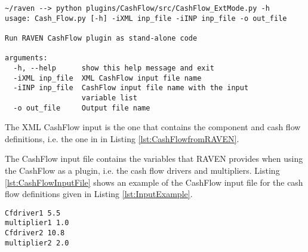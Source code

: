 \small
\begin{lstlisting}[caption=CashFlow run as stand-alone python code, label=lst:CashFlowAsCode]
~/raven --> python plugins/CashFlow/src/CashFlow_ExtMode.py -h
usage: Cash_Flow.py [-h] -iXML inp_file -iINP inp_file -o out_file

Run RAVEN CashFlow plugin as stand-alone code

arguments:
  -h, --help      show this help message and exit
  -iXML inp_file  XML CashFlow input file name
  -iINP inp_file  CashFlow input file name with the input 
                  variable list
  -o out_file     Output file name
\end{lstlisting}
\normalsize

The XML CashFlow input is the one that contains the component and cash flow definitions, i.e. the one in  in Listing \ref{lst:CashFlowfromRAVEN}.

The CashFlow input file contains the variables that RAVEN provides when using the CashFlow as a plugin, i.e. the cash flow drivers and multipliers. Listing \ref{lst:CashFlowInputFile} shows an example of the CashFlow input file for the cash flow definitions given in Listing \ref{lst:InputExample}.

\begin{lstlisting}[caption=CashFlow run as stand-alone python code, label=lst:CashFlowInputFile]
Cfdriver1 5.5
multiplier1 1.0
Cfdriver2 10.8
multiplier2 2.0
\end{lstlisting}
